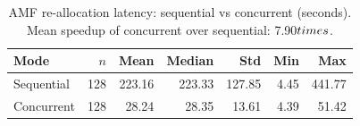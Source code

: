 \begin{table}[htbp]
\centering
\caption{AMF re-allocation latency: sequential vs concurrent (seconds). Mean speedup of concurrent over sequential: 7.90$\\times$.}
\label{tab:comparison}
\begin{tabular}{lrrrrrr}
\hline
Mode & $n$ & Mean & Median & Std & Min & Max \\
\hline
Sequential & 128 & 223.16 & 223.33 & 127.85 & 4.45 & 441.77 \\
Concurrent & 128 & 28.24 & 28.35 & 13.61 & 4.39 & 51.42 \\
\hline
\end{tabular}
\end{table}
